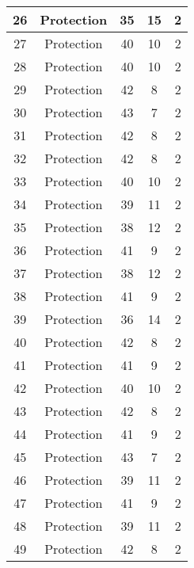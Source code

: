 \documentclass[results.tex]{subfiles}
\begin{document}
\begin{center}
\begin{tabular}{| c || c | c | c | c |}
    \hline
    26 & Protection & 35 & 15 & 2 \\ 
    \hline
    27 & Protection & 40 & 10 & 2 \\ 
    \hline
    28 & Protection & 40 & 10 & 2 \\ 
    \hline
    29 & Protection & 42 & 8 & 2 \\ 
    \hline
    30 & Protection & 43 & 7 & 2 \\ 
    \hline
    31 & Protection & 42 & 8 & 2 \\ 
    \hline
    32 & Protection & 42 & 8 & 2 \\ 
    \hline
    33 & Protection & 40 & 10 & 2 \\ 
    \hline
    34 & Protection & 39 & 11 & 2 \\ 
    \hline
    35 & Protection & 38 & 12 & 2 \\ 
    \hline
    36 & Protection & 41 & 9 & 2 \\ 
    \hline
    37 & Protection & 38 & 12 & 2 \\ 
    \hline
    38 & Protection & 41 & 9 & 2 \\ 
    \hline
    39 & Protection & 36 & 14 & 2 \\ 
    \hline
    40 & Protection & 42 & 8 & 2 \\ 
    \hline
    41 & Protection & 41 & 9 & 2 \\ 
    \hline
    42 & Protection & 40 & 10 & 2 \\ 
    \hline
    43 & Protection & 42 & 8 & 2 \\ 
    \hline
    44 & Protection & 41 & 9 & 2 \\ 
    \hline
    45 & Protection & 43 & 7 & 2 \\ 
    \hline
    46 & Protection & 39 & 11 & 2 \\ 
    \hline
    47 & Protection & 41 & 9 & 2 \\ 
    \hline
    48 & Protection & 39 & 11 & 2 \\ 
    \hline
    49 & Protection & 42 & 8 & 2 \\ 
    \hline   \end{tabular}
\end{center}
\end{document}

